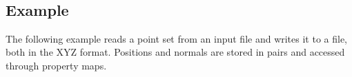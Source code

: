   \\
  \\
 \\
 \\


\subsection{Example}

The following example reads a point set from an input file and writes it to a file, both in the XYZ format. Positions and normals are stored in pairs and accessed through property maps.
